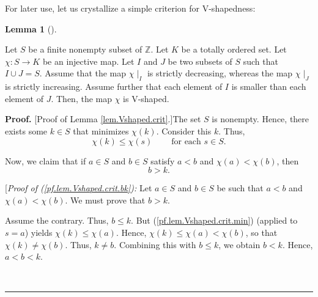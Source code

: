 \documentclass[numbers=enddot,12pt,final,onecolumn,notitlepage]{scrartcl}%
\theoremstyle{definition}
\newtheorem{lem}[theo]{Lemma}
\newenvironment{lemma}[1][]
{\begin{lem}[#1]\begin{leftbar}}
{\end{leftbar}\end{lem}}
\newenvironment{proof}[1][Proof]{\noindent\textbf{#1.} }{\ \rule{0.5em}{0.5em}}
\newenvironment{verlong}{}{}
\begin{document}
\begin{verlong}
For later use, let us crystallize a simple criterion for V-shapedness:

\begin{lemma}
\label{lem.Vshaped.crit}Let $S$ be a finite nonempty subset of $\mathbb{Z}$.
Let $K$ be a totally ordered set. Let $\chi:S\rightarrow K$ be an injective
map. Let $I$ and $J$ be two subsets of $S$ such that $I\cup J=S$. Assume that
the map $\chi\mid_{I}$ is strictly decreasing, whereas the map $\chi\mid_{J}$
is strictly increasing. Assume further that each element of $I$ is smaller
than each element of $J$. Then, the map $\chi$ is V-shaped.
\end{lemma}

\begin{proof}
[Proof of Lemma \ref{lem.Vshaped.crit}.]The set $S$ is nonempty. Hence, there
exists some $k\in S$ that minimizes $\chi\left(  k\right)  $. Consider this
$k$. Thus,%
\begin{equation}
\chi\left(  k\right)  \leq\chi\left(  s\right)  \ \ \ \ \ \ \ \ \ \ \text{for
each }s\in S. \label{pf.lem.Vshaped.crit.min}%
\end{equation}


Now, we claim that if $a\in S$ and $b\in S$ satisfy $a<b$ and $\chi\left(
a\right)  <\chi\left(  b\right)  $, then%
\begin{equation}
b>k. \label{pf.lem.Vshaped.crit.bk}%
\end{equation}


[\textit{Proof of (\ref{pf.lem.Vshaped.crit.bk}):} Let $a\in S$ and $b\in S$
be such that $a<b$ and $\chi\left(  a\right)  <\chi\left(  b\right)  $. We
must prove that $b>k$.

Assume the contrary. Thus, $b\leq k$. But (\ref{pf.lem.Vshaped.crit.min})
(applied to $s=a$) yields $\chi\left(  k\right)  \leq\chi\left(  a\right)  $.
Hence, $\chi\left(  k\right)  \leq\chi\left(  a\right)  <\chi\left(  b\right)
$, so that $\chi\left(  k\right)  \neq\chi\left(  b\right)  $. Thus, $k\neq
b$. Combining this with $b\leq k$, we obtain $b<k$. Hence, $a<b<k$.


\end{proof}
\end{verlong}
\end{document}
